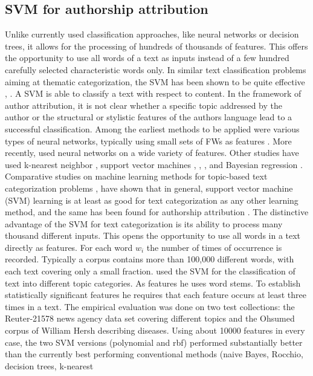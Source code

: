 \subsection{SVM for authorship attribution}
Unlike currently used
classification approaches, like neural networks or decision trees, it allows for the processing of hundreds of thousands of features. This offers the opportunity to use all words of a text as inputs instead of a few hundred carefully selected characteristic words only. In similar text classification problems aiming at thematic categorization, the SVM has been shown to be quite effective \cite{joachims1998making}, \cite{dumais1998inductive}.
A SVM is able to classify a text with respect to content. In the framework of author attribution, it is not clear whether a specific topic addressed by the author or the structural or stylistic features of the authors language lead to a successful classification.
Among the earliest methods to be applied were various types of neural networks, typically using small sets of FWs as features \cite{holmes1995forensic}.
More recently, \cite{hirst2007bigrams} used neural networks on a wide variety of features. Other studies have used k-nearest neighbor \cite{zhao2005effective}, support vector machines \cite{diederich2003authorship}, \cite{koppel2005determining}, \cite{zheng2006framework}, and Bayesian regression \cite{madigan2005author}.
Comparative studies on machine learning methods for topic-based text categorization problems \cite{dumais1998inductive}, \cite{joachims1998making} have shown that in general, support vector machine (SVM) learning is at least as good for text categorization as any other
learning method, and the same has been found for authorship attribution \cite{zheng2006framework}.
The distinctive advantage of the SVM for text categorization is its ability to process many thousand different inputs. This opens the opportunity to use all words
in a text directly as features. For each word $w_i$ the number of times of occurrence is recorded. Typically a corpus contains more than 100,000 different words,
with each text covering only a small fraction.
\citeauthor{joachims1998making} \cite{joachims1998making} used the SVM for the classification of text into different topic categories. As features he uses word stems. To establish statistically significant features he requires that each feature occurs at least three times in a text. The empirical evaluation was done
on two test collections: the Reuter-21578 news agency
data set covering different topics and the Ohsumed corpus of William Hersh describing diseases. Using about 10000 features in every case, the two SVM versions (polynomial and rbf) performed substantially better than the currently best performing conventional methods (naive Bayes, Rocchio, decision trees, k-nearest
